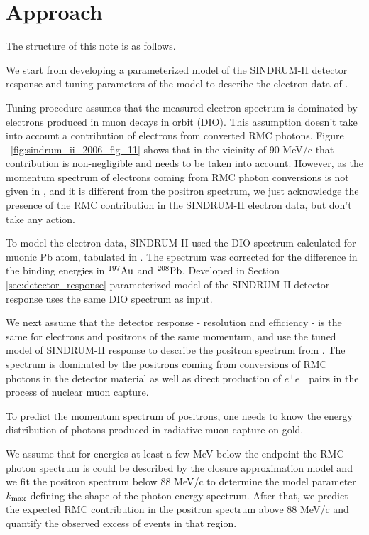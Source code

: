 \documentclass[12pt]{article}
\newcommand {\Pb}[1]     {\mbox{$\rm ^{#1}Pb$}}                 %
\newcommand {\Au}[1]     {\mbox{$\rm ^{#1}Au$}}                 %
\newcommand {\kmax}      {\mbox{$k_{\rm max}$}}
\begin{document}
\section { Approach}

The structure of this note is as follows.

We start from developing a parameterized model of the SINDRUM-II detector response
and tuning parameters of the model to describe the electron data of \cite{sindrum_ii:Bertl2006}. 

Tuning procedure assumes that the measured electron spectrum is dominated
by electrons produced in muon decays in orbit (DIO). This assumption
doesn't take into account a contribution of electrons from converted RMC photons. 
Figure ~\ref{fig:sindrum_ii_2006_fig_11} shows that in the vicinity of 90 MeV/c
that contribution is non-negligible and needs to be taken into account.
However, as the momentum spectrum of electrons coming from RMC photon
conversions is not given in \cite{sindrum_ii:Bertl2006}, and it is different
from the positron spectrum, we just acknowledge the presence of the RMC
contribution in the SINDRUM-II electron data, but don't take any action. 

To model the electron data, SINDRUM-II used the DIO spectrum calculated
for muonic Pb atom, tabulated in \cite{Watanabe_1993}. The spectrum was
corrected for the difference in the binding energies in \Au{197} and \Pb{208}.
Developed in Section \ref{sec:detector_response} parameterized model 
of the SINDRUM-II detector response uses the same DIO spectrum as input. 

We next assume that the detector response - resolution and efficiency - 
is the same for electrons and positrons of the same momentum,
and use the tuned model of SINDRUM-II response to describe the positron spectrum
from \cite{sindrum_ii:Bertl2006}. The spectrum is dominated by the positrons 
coming from conversions of RMC photons in the detector material as well as
direct production of $e^+e^-$ pairs in the process of nuclear muon capture.

To predict the momentum spectrum of positrons, one needs to know the
energy distribution of photons produced in radiative muon capture on gold.   

We assume that for energies at least a few MeV below the endpoint the RMC photon
spectrum is could be described by the closure approximation model and we fit the
positron spectrum below 88 MeV/c to determine the model parameter $\kmax$ defining
the shape of the photon energy spectrum. After that, we predict the expected 
RMC contribution in the positron spectrum above 88 MeV/c and quantify the observed
excess of events in that region.
\end{document}
